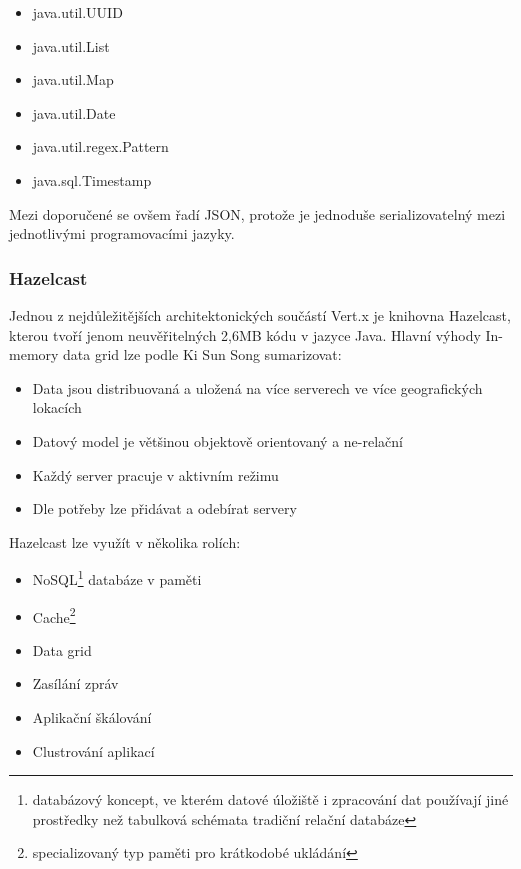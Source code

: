 \begin{itemize}
\item{java.util.UUID}
\item{java.util.List}
\item{java.util.Map}
\item{java.util.Date}
\item{java.util.regex.Pattern}
\item{java.sql.Timestamp}
\end{itemize}

Mezi doporučené se ovšem řadí JSON, protože je jednoduše serializovatelný mezi jednotlivými programovacími jazyky.

\subsubsection{Hazelcast}

Jednou z nejdůležitějších architektonických součástí Vert.x je knihovna Hazelcast, kterou tvoří jenom neuvěřitelných 2,6MB kódu v jazyce Java. Hlavní výhody In-memory data grid\cite{inMemoryDataGrid} lze podle Ki Sun Song sumarizovat:
\begin{itemize}
\item{Data jsou distribuovaná a uložená na více serverech ve více geografických lokacích}
\item{Datový model je většinou objektově orientovaný a ne-relační}
\item{Každý server pracuje v aktivním režimu}
\item{Dle potřeby lze přidávat a odebírat servery}
\end{itemize}

Hazelcast lze využít v několika rolích:
\begin{itemize}
\item{NoSQL\footnote{databázový koncept, ve kterém datové úložiště i zpracování dat používají jiné prostředky než tabulková schémata tradiční relační databáze} databáze v paměti}
\item{Cache\footnote{specializovaný typ paměti pro krátkodobé ukládání}}
\item{Data grid}
\item{Zasílání zpráv}
\item{Aplikační škálování}
\item{Clustrování aplikací}
\end{itemize}

